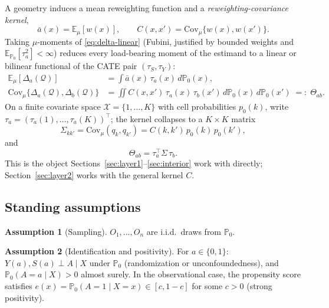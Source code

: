 \documentclass[11pt]{article}
\theoremstyle{plain}
\theoremstyle{definition}
\newtheorem{assumption}{Assumption}
\theoremstyle{remark}
\newcommand{\E}{\mathbb{E}}
\newcommand{\PP}{\mathbb{P}}
\newcommand{\cX}{\mathcal{X}}
\newcommand{\Q}{\mathcal{Q}}
\newcommand{\Cov}{\mathrm{Cov}}
\begin{document}
A geometry induces a mean reweighting function and a \emph{reweighting-covariance
kernel},
\begin{equation}\label{eq:kernel-def}
    \bar a(x) = \E_\mu[w(x)], \qquad C(x,x') = \Cov_\mu\{w(x),w(x')\}.
\end{equation}
Taking $\mu$-moments of \eqref{eq:delta-linear} (Fubini, justified by bounded weights
and $\E_{\PP_0}[\tau_a^2]<\infty$) reduces every load-bearing moment of the estimand to
a linear or bilinear functional of the CATE pair $(\tau_S,\tau_Y)$:
\begin{align}
    \E_\mu[\Delta_a(\Q)] &= \int \bar a(x)\,\tau_a(x)\,d\PP_0(x),
    \tag{linear}\label{eq:reduction-linear}\\
    \Cov_\mu\{\Delta_a(\Q),\Delta_b(\Q)\} &= \iint C(x,x')\,\tau_a(x)\,\tau_b(x')\,
        d\PP_0(x)\,d\PP_0(x') \;=:\; \Theta_{ab}. \tag{bilinear}\label{eq:reduction-bilinear}
\end{align}
On a finite covariate space $\cX=\{1,\dots,K\}$ with cell probabilities $p_0(k)$, write
$\tau_a=(\tau_a(1),\dots,\tau_a(K))^\top$; the kernel collapses to a $K\times K$ matrix
\begin{equation}\label{eq:sigma-def}
    \Sigma_{kk'} = \Cov_\mu(q_k,q_{k'}) = C(k,k')\,p_0(k)\,p_0(k'),
\end{equation}
and
\begin{equation}\label{eq:discrete-quadform}
    \Theta_{ab} = \tau_a^\top\Sigma\,\tau_b.
\end{equation}
This is the object Sections~\ref{sec:layer1}--\ref{sec:interior} work with directly;
Section~\ref{sec:layer2} works with the general kernel $C$.

\subsection{Standing assumptions}

\begin{assumption}[Sampling]\label{ass:iid}
$O_1,\dots,O_n$ are i.i.d.\ draws from $\PP_0$.
\end{assumption}

\begin{assumption}[Identification and positivity]\label{ass:causal}
For $a\in\{0,1\}$: $Y(a),S(a)\perp A\mid X$ under $\PP_0$ (randomization or
unconfoundedness), and $\PP_0(A=a\mid X)>0$ almost surely. In the observational case,
the propensity score satisfies $e(x)=\PP_0(A=1\mid X=x)\in[c,1-c]$ for some $c>0$
(strong positivity).
\end{assumption}
\end{document}
